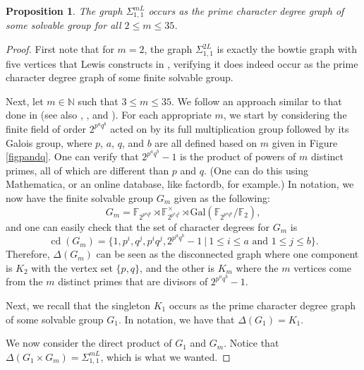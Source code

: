 \documentclass[11pt]{amsart}
\newtheorem{proposition}[theorem]{Proposition}
\theoremstyle{definition}
\theoremstyle{remark}
\DeclareMathOperator{\cd}{cd}
\numberwithin{equation}{section}
\newcommand{\SLi}[3]{\Sigma_{#1,#2}^{#3L}} %
\begin{document}
\begin{proposition}\label{prop11mL}
The graph $\SLi{1}{1}{m}$ occurs as the prime character degree graph of some solvable group for all $2\leq m\leq35$.
\end{proposition}
\begin{proof}
First note that for $m=2$, the graph $\SLi{1}{1}{2}$ is exactly the bowtie graph with five vertices that Lewis constructs in \cite{L3}, verifying it does indeed occur as the prime character degree graph of some finite solvable group.

Next, let $m\in\mathbb{N}$ such that $3\leq m\leq35$. We follow an approach similar to that done in \cite{L3} (see also \cite{BLL}, \cite{LMS}, and \cite{LS2}). For each appropriate $m$, we start by considering the finite field of order $2^{p^aq^b}$ acted on by its full multiplication group followed by its Galois group, where $p$, $a$, $q$, and $b$ are all defined based on $m$ given in Figure \ref{figpandq}. One can verify that $2^{p^aq^b}-1$ is the product of powers of $m$ distinct primes, all of which are different than $p$ and $q$. (One can do this using Mathematica, or an online database, like factordb, for example.) In notation, we now have the finite solvable group $G_m$ given as the following:
$$
G_m=\mathbb{F}_{2^{p^aq^b}}\rtimes\mathbb{F}_{2^{p^aq^b}}^\times\rtimes\text{Gal}(\mathbb{F}_{2^{p^aq^b}}/\mathbb{F}_2),
$$
and one can easily check that the set of character degrees for $G_m$ is
$$
\cd(G_m)=\{1,p^i,q^j,p^iq^j,2^{p^aq^b}-1~|~1\leq i\leq a\text{~and~}1\leq j\leq b\}.
$$
Therefore, $\Delta(G_m)$ can be seen as the disconnected graph where one component is $K_2$ with the vertex set $\{p,q\}$, and the other is $K_m$ where the $m$ vertices come from the $m$ distinct primes that are divisors of $2^{p^aq^b}-1$.

Next, we recall that the singleton $K_1$ occurs as the prime character degree graph of some solvable group $G_1$. In notation, we have that $\Delta(G_1)=K_1$.

We now consider the direct product of $G_1$ and $G_m$. Notice that $\Delta(G_1\times G_m)=\SLi{1}{1}{m}$, which is what we wanted.
\end{proof}
\end{document}
